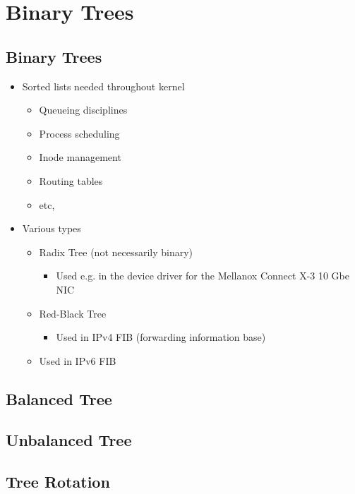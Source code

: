 \section{Binary Trees}

\subsection{Binary Trees}

\begin{itemize}
	\item Sorted lists needed throughout kernel
	\begin{itemize}
		\item Queueing disciplines
		\item Process scheduling
		\item Inode management
		\item Routing tables
		\item etc,
	\end{itemize}
	\item Various types
	\begin{itemize}
		\item Radix Tree (not necessarily binary)
		\begin{itemize}
			\item Used e.g. in the device driver for the Mellanox
				Connect X-3 10 Gbe NIC
		\end{itemize}
		\item Red-Black Tree
		\begin{itemize}
			\item Used in IPv4 FIB (forwarding information base)
		\end{itemize}
		\item Used in IPv6 FIB
	\end{itemize}
\end{itemize}

\subsection{Balanced Tree}

\subsection{Unbalanced Tree}

\subsection{Tree Rotation}

